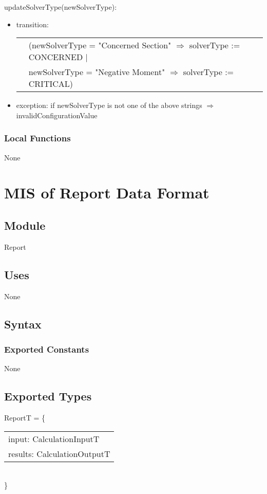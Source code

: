\documentclass[12pt, titlepage]{article}
\begin{document}
\noindent updateSolverType(newSolverType):
\begin{itemize}
\item transition:\\
\begin{tabular}{p{1cm} p{16cm}}
& (newSolverType = "Concerned Section" $\Rightarrow$ solverType := CONCERNED $|$\\
& newSolverType = "Negative Moment" $\Rightarrow$ solverType := CRITICAL)\\
\end{tabular}

\item exception: if newSolverType is not one of the above strings $\Rightarrow$ invalidConfigurationValue
\end{itemize}

\subsubsection{Local Functions}
None
\newpage

\section{MIS of Report Data Format} \label{Report} 

\subsection{Module}

Report

\subsection{Uses}
None

\subsection{Syntax}

\subsubsection{Exported Constants}
None
\subsection{Exported Types}
ReportT = \{\\
    \begin{tabular}{l}
	input: CalculationInputT\\
    results: CalculationOutputT\\
    \end{tabular}
\\\}
\end{document}
